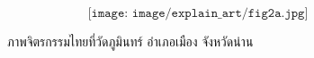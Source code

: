\begin{figure}[h]
	\[
	\texttt{[image: image/explain\_art/fig2a.jpg]}
	\]
	\caption{ภาพจิตรกรรมไทยที่วัดภูมินทร์ อำเภอเมือง จังหวัดน่าน}
	\label{figure:inpaint-thaiairt-explain}
\end{figure}